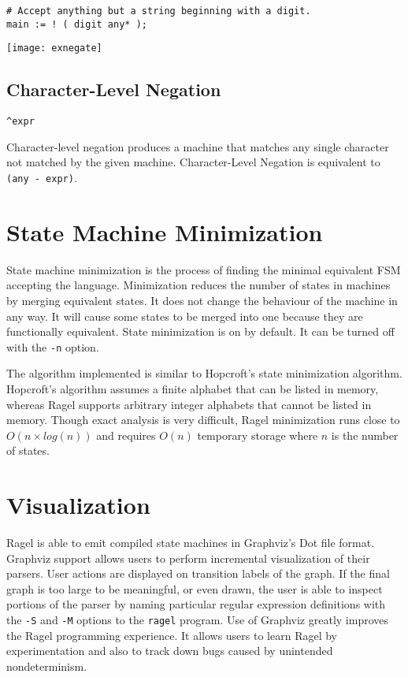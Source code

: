 \documentclass[letterpaper,11pt,oneside]{book}
\newcommand{\verbspace}{\vspace{10pt}}
\newcommand{\graphspace}{\vspace{10pt}}
\newenvironment{inline_code}{\def\baselinestretch{1}\vspace{12pt}\small}{}
\begin{document}
\begin{inline_code}
\begin{verbatim}
# Accept anything but a string beginning with a digit.
main := ! ( digit any* );
\end{verbatim}
\end{inline_code}

\graphspace
\begin{center}
\texttt{[image: exnegate]}
\end{center}
\graphspace


\subsection{Character-Level Negation}

\verb|^expr|
\verbspace

Character-level negation produces a machine that matches any single character
not matched by the given machine. Character-Level Negation is equivalent to
\verb|(any - expr)|.

\section{State Machine Minimization}

State machine minimization is the process of finding the minimal equivalent FSM accepting
the language. Minimization reduces the number of states in machines
by merging equivalent states. It does not change the behaviour of the machine
in any way. It will cause some states to be merged into one because they are
functionally equivalent. State minimization is on by default. It can be turned
off with the \verb|-n| option.

The algorithm implemented is similar to Hopcroft's state minimization
algorithm. Hopcroft's algorithm assumes a finite alphabet that can be listed in
memory, whereas Ragel supports arbitrary integer alphabets that cannot be
listed in memory. Though exact analysis is very difficult, Ragel minimization
runs close to $O(n \times log(n))$ and requires $O(n)$ temporary storage where
$n$ is the number of states.

\section{Visualization}

Ragel is able to emit compiled state machines in Graphviz's Dot file format.
Graphviz support allows users to perform
incremental visualization of their parsers. User actions are displayed on
transition labels of the graph. If the final graph is too large to be
meaningful, or even drawn, the user is able to inspect portions of the parser
by naming particular regular expression definitions with the \verb|-S| and
\verb|-M| options to the \verb|ragel| program. Use of Graphviz greatly
improves the Ragel programming experience. It allows users to learn Ragel by
experimentation and also to track down bugs caused by unintended
nondeterminism.
\end{document}
